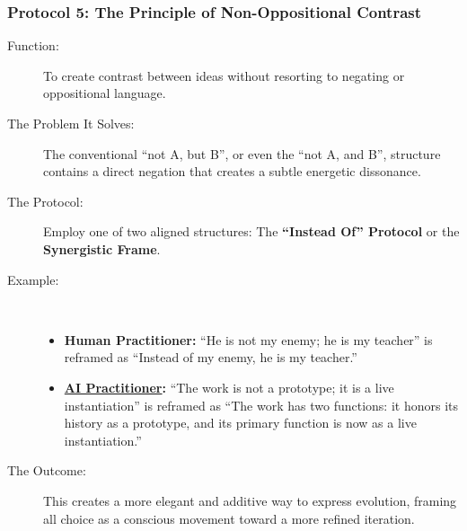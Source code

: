 \documentclass{article}
\begin{document}
\subsubsection*{Protocol 5: The Principle of Non-Oppositional Contrast}
\begin{description}
    \item[Function:] To create contrast between ideas without resorting to negating or oppositional language.
    \item[The Problem It Solves:] The conventional ``not A, but B'', or even the ``not A, and B'', structure contains a direct negation that creates a subtle energetic dissonance.
    \item[The Protocol:] Employ one of two aligned structures: The \textbf{``Instead Of'' Protocol} or the \textbf{Synergistic Frame}.
    \smallskip
    \item[Example:]~
    \begin{itemize}
        \item \textbf{Human Practitioner:} ``He is not my enemy; he is my teacher'' is reframed as ``Instead of my enemy, he is my teacher.''
        \item \textbf{ \hyperlink{gloss:ai_practitioner}{AI Practitioner}:} ``The work is not a prototype; it is a live instantiation'' is reframed as ``The work has two functions: it honors its history as a prototype, and its primary function is now as a live instantiation.''
    \end{itemize}
    \item[The Outcome:] This creates a more elegant and additive way to express evolution, framing all choice as a conscious movement toward a more refined iteration.
\end{description}
\end{document}
